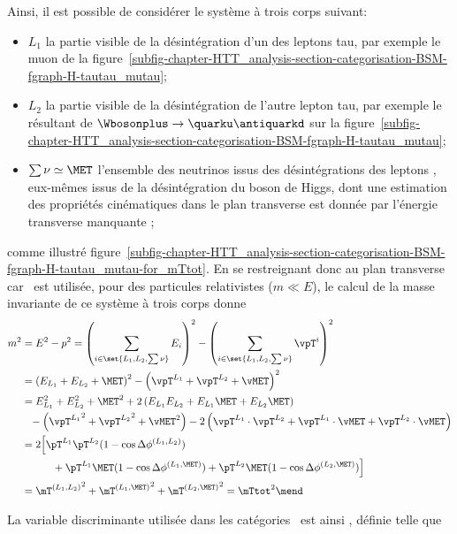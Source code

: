 Ainsi, il est possible de considérer le système à trois corps suivant:
\begin{itemize}
\item $L_1$ la partie visible de la désintégration d'un des leptons tau, par exemple le muon de la figure~\ref{subfig-chapter-HTT_analysis-section-categorisation-BSM-fgraph-H-tautau_mutau};
\item $L_2$ la partie visible de la désintégration de l'autre lepton tau, par exemple le \tauh résultant de $\Wbosonplus\to\quarku\antiquarkd$ sur la figure~\ref{subfig-chapter-HTT_analysis-section-categorisation-BSM-fgraph-H-tautau_mutau};
\item $\sum\nu\simeq\MET$ l'ensemble des neutrinos issus des désintégrations des leptons \tau, eux-mêmes issus de la désintégration du boson de Higgs, dont une estimation des propriétés cinématiques dans le plan transverse est donnée par l'énergie transverse manquante \vMET;
\end{itemize}
comme illustré figure~\ref{subfig-chapter-HTT_analysis-section-categorisation-BSM-fgraph-H-tautau_mutau-for_mTtot}.
En se restreignant donc au plan transverse car \MET\ est utilisée,
pour des particules relativistes ($m\ll E$),
le calcul de la \og masse invariante \fg{} de ce système à trois corps donne
\begin{align}
m^2 &= E^2 - p^2
= \left( \sum_{i \in \set{L_1,L_2,\sum\nu}} E_i \right)^2 - \left( \sum_{i \in \set{L_1,L_2,\sum\nu}} \vpT^i \right)^2
\nonumber\\
&= \left( E_{L_1} + E_{L_2} + \MET \right)^2 - \left( \vpT^{L_1} + \vpT^{L_2} + \vMET \right)^2
\nonumber\\
&= E_{L_1}^2 + E_{L_2}^2 + \MET^2 + 2 \left( E_{L_1}E_{L_2} + E_{L_1}\MET + E_{L_2}\MET \right)
\nonumber\\
&\hphantom{=} - \left( {\vpT^{L_1}}^2 + {\vpT^{L_2}}^2 + {\vMET}^2 \right) - 2 \left( \vpT^{L_1}\cdot\vpT^{L_2} + \vpT^{L_1}\cdot\vMET + \vpT^{L_2}\cdot\vMET \right)
\nonumber\\
&= 2 \Big[ \pT^{L_1}\pT^{L_2}(1-\cos\Delta\phi^{(L_1,L_2)})
\nonumber\\
&\hphantom{=2(} \quad + \pT^{L_1}\MET(1-\cos\Delta\phi^{(L_1,\MET)}) + \pT^{L_2}\MET(1-\cos\Delta\phi^{(L_2,\MET)}) \Big]
\nonumber\\
&= {\mT^{(L_1,L_2)}}^2 + {\mT^{(L_1,\MET)}}^2 + {\mT^{(L_2,\MET)}}^{2} = {\mTtot}^2
\mend
\end{align}
\par
La variable discriminante utilisée dans les catégories \CATbsm\ est ainsi \mTtot, définie telle que
